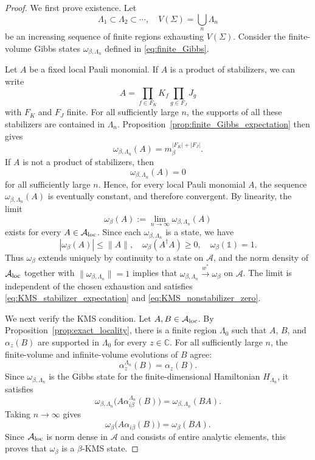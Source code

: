 \documentclass[a4paper,11pt]{article}
\theoremstyle{definition}
\theoremstyle{remark}
\theoremstyle{remark}
\begin{document}
\begin{proof}
    We first prove existence. Let
    \[
        \Lambda_1\subset\Lambda_2\subset\cdots,\quad V(\Sigma) = \bigcup_n \Lambda_n
    \]
    be an increasing sequence of finite regions exhausting $V(\Sigma)$. Consider the finite-volume Gibbs states $\omega_{\beta,\Lambda_n}$ defined in
    \eqref{eq:finite_Gibbs}.

    Let $A$ be a fixed local Pauli monomial. If $A$ is a product of stabilizers, we can write 
    \[
        A= \prod_{f\in F_K}K_f \prod_{g\in F_J}J_g
    \]
    with $F_K$ and $F_J$ finite. For all sufficiently large $n$, the supports of all these stabilizers are contained in $\Lambda_n$. Proposition~\ref{prop:finite_Gibbs_expectation} then gives
    \[
        \omega_{\beta,\Lambda_n}(A) = m_\beta^{|F_K|+|F_J|}.
    \]
    If $A$ is not a product of stabilizers, then
    \[
        \omega_{\beta,\Lambda_n}(A)=0
    \]
    for all sufficiently large $n$. Hence, for every local Pauli monomial $A$, the sequence $\omega_{\beta,\Lambda_n}(A)$ is eventually constant, and therefore convergent. By linearity, the limit
    \[
        \omega_\beta(A):=\lim_{n\to\infty}\omega_{\beta,\Lambda_n}(A)
    \]
    exists for every $A\in\mathcal A_{\rm loc}$. Since each $\omega_{\beta,\Lambda_n}$ is a state, we have
    \[
        |\omega_\beta(A)|\leq\|A\|,\quad
        \omega_\beta(A^\dagger A)\geq0,\quad
        \omega_\beta(\mathds{1})=1.
    \]
    Thus $\omega_\beta$ extends uniquely by continuity to a state on $\mathcal A$, and the norm density of $\mathcal A_{\rm loc}$ together with $\|\omega_{\beta,\Lambda_n}\|=1$ implies that $\omega_{\beta,\Lambda_n}\xrightarrow{w^*}\omega_\beta$ on $\mathcal A$. The limit is independent of the chosen exhaustion and satisfies \eqref{eq:KMS_stabilizer_expectation} and \eqref{eq:KMS_nonstabilizer_zero}.

    We next verify the KMS condition. Let $A,B\in\mathcal A_{\rm loc}$. By Proposition~\ref{prop:exact_locality}, there is a finite region $\Lambda_0$ such that $A$, $B$, and $\alpha_z(B)$ are supported in $\Lambda_0$ for every $z\in\mathbb C$. For all sufficiently large $n$, the finite-volume and infinite-volume evolutions of $B$ agree:
    \[
        \alpha_z^{\Lambda_n}(B) =\alpha_z(B).
    \]
    Since $\omega_{\beta,\Lambda_n}$ is the Gibbs state for the finite-dimensional Hamiltonian $H_{\Lambda_n}$, it satisfies
    \[
        \omega_{\beta,\Lambda_n}\bigl(A\alpha_{i\beta}^{\Lambda_n}(B)\bigr)=\omega_{\beta,\Lambda_n}(BA).
    \]
    Taking $n\to\infty$ gives
    \[
        \omega_\beta\bigl(A\alpha_{i\beta}(B)\bigr)=\omega_\beta(BA).
    \]
    Since $\mathcal A_{\rm loc}$ is norm dense in $\mathcal A$ and consists of entire analytic elements, this proves that $\omega_\beta$ is a $\beta$-KMS state.


\end{proof}
\end{document}
